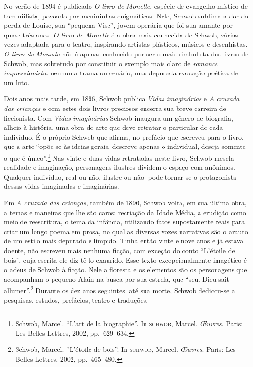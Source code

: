 No verão de 1894 é publicado \textit{O livro de Monelle},
espécie de evangelho místico de tom niilista, povoado por menininhas
enigmáticas. Nele, Schwob sublima a dor da perda de Louise, sua
“pequena Vise”, jovem operária que foi sua amante por quase três anos.
\textit{O livro de Monelle} é a obra mais conhecida de Schwob, várias vezes
adaptada para o teatro, inspirando artistas plásticos, músicos e desenhistas.
\textit{O livro de Monelle} não é apenas conhecido por ser o mais simbolista
dos livros de Schwob, mas sobretudo por constituir o exemplo mais claro de
\textit{romance impressionista}: nenhuma trama ou cenário, mas depurada
evocação poética de um luto.

Dois anos mais tarde, em 1896, Schwob publica \textit{Vidas imaginárias} e
\textit{A cruzada das crianças} e com estes dois livros preciosos
encerra sua breve carreira de ficcionista. Com \textit{Vidas imaginárias} Schwob
inaugura um gênero de biografia, alheio à história, uma obra de
arte que deve retratar o particular de cada indivíduo. É o próprio Schwob que
afirma, no prefácio que escreveu para o livro, que a arte “opõe-se às ideias
gerais, descreve apenas o individual, deseja somente o que é único”.\footnote{ Schwob, Marcel. 
``L’art de la biographie''. In \textsc{schwob}, Marcel. \textit{\OE uvres}.
Paris: Les Belles Lettres, 2002, pp.~629--634.} Nas vinte e duas vidas
retratadas neste livro, Schwob mescla realidade e imaginação, personagens
ilustres dividem o espaço com anônimos. Qualquer indivíduo, real ou não,
ilustre ou não, pode tornar-se o protagonista dessas vidas imaginadas e imaginárias.

Em \textit{A cruzada das crianças}, também de 1896,
Schwob volta, em sua última obra, a temas e maneiras que lhe são caros:
recriação da Idade Média, a erudição como meio de reescritura, o tema da
infância, utilizando fatos supostamente reais para criar um longo poema em
prosa, no qual as diversas vozes narrativas são o arauto de um estilo mais
depurado e límpido. Tinha então vinte e nove anos e já estava doente, não
escreveu mais nenhuma ficção, com exceção do conto “L'étoile de bois”, cuja
escrita ele diz tê-lo exaurido. Esse texto excepcionalmente imagético é o adeus de Schwob
à ficção. Nele a floresta e
os elementos são os personagens que acompanham o pequeno Alain na busca por sua
estrela, que “seul Dieu sait allumer”.\footnote{ Schwob, Marcel. ``L’étoile de
bois''. In \textsc{schwob}, Marcel. \textit{\OE uvres}. Paris: Les Belles Lettres, 2002, pp.~465--480.}
Durante os dez anos seguintes, até sua morte, Schwob dedicou-se a
pesquisas, estudos, prefácios, teatro e traduções.

